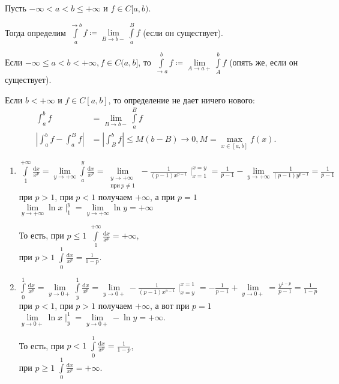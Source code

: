 \begin{definition}
    Пусть $-\infty < a < b \le +\infty$ и $f \in C[a, b)$.

    Тогда определим  $\int\limits_a^{\to b} f\coloneqq \lim\limits_{B \to b-} \int\limits_a^B f$ (если он существует).

    Если $-\infty \le a < b < +\infty, f \in C(a, b]$, то $\int\limits_{\to a}^b f \coloneqq \lim\limits_{A \to a+} \int\limits_A^b f$ (опять же, если он существует).
\end{definition}
\begin{remark}
    Если $b < +\infty$ и  $f \in C[a, b]$, то определение не дает ничего нового:  \begin{align*}
        \int_a^b f &= \lim\limits_{B \to b-} \int\limits_a^B f \\
        \left|\int_a^b f - \int_a^B f\right| &= \left| \int_B^b f \right| \le M(b-B) \to 0, M = \max\limits_{x \in [a, b]} f(x)
    .\end{align*}
\end{remark}
\begin{example}
    \begin{enumerate}
        \item $\int\limits_1^{+\infty} \frac{\mathrm{d}x}{x^p} = \lim\limits_{y \to +\infty} \int\limits_a^y \frac{\mathrm{d}x}{x^p} = \lim\limits_{\substack{y \to +\infty \\ \text{при}\ p \neq 1}} -\frac{1}{(p-1)x^{p-1}}\mid_{x=1}^{x=y} = \frac{1}{p-1} - \lim\limits_{y \to +\infty} \frac{1}{(p-1)y^{p-1}} = \frac{1}{p-1}$ при $p > 1$, при $p < 1$ получаем $+\infty$, а при $p = 1$  $\lim\limits_{y \to +\infty} \ln x \mid_1^y = \lim\limits_{y \to +\infty} \ln y = +\infty$
        
        То есть, при  $p \le 1$  $\int\limits_1^{+\infty} \frac{\mathrm{d}x}{x^p} = {+\infty}$, \\
        при $p > 1$ $\int\limits_0^1 \frac{\mathrm{d}x}{x^p} = \frac{1}{1 - p}$.
        
        \item $\int\limits_0^1 \frac{\mathrm{d}x}{x^p} = \lim\limits_{y \to 0+} \int\limits_y^1 \frac{\mathrm{d}x}{x^p} = \lim \limits_{y \to 0+} -\frac{1}{(p-1)x^{p-1}} \mid_{x=y}^{x=1} = -\frac{1}{p - 1} + \lim\limits_{y \to 0+} = \frac{y^{1-p}}{p - 1} = \frac{1}{1 - p}$ при $p < 1$, при  $p > 1$ получаем  $+\infty$, а вот при  $p = 1$  $\lim\limits_{y \to 0+} \ln x \mid_y^1 = \lim\limits_{y \to 0+} - \ln y = +\infty$.

            То есть, при  $p < 1$  $\int\limits_0^1 \frac{\mathrm{d}x}{x^p} = \frac{1}{1 - p}$, \\
            при $p \ge 1$ $\int\limits_0^1 \frac{\mathrm{d}x}{x^p} = +\infty$.
    \end{enumerate}
\end{example}

